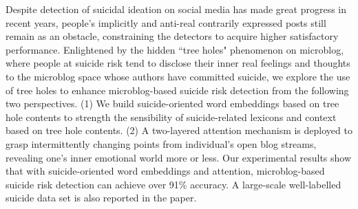 Despite detection of suicidal ideation on social media has made great progress in recent years, people's implicitly and anti-real contrarily expressed posts still remain as an obstacle,
constraining the detectors to acquire higher satisfactory performance. Enlightened by the hidden ``tree holes" phenomenon on microblog, where people at suicide risk tend to disclose their inner real feelings and thoughts to the microblog space whose authors have committed suicide, we explore the use of tree holes to enhance microblog-based suicide risk detection from the following two perspectives.
(1) We build suicide-oriented word embeddings based on tree hole contents
to strength the sensibility of suicide-related lexicons and context based on tree hole contents.
(2) A two-layered attention mechanism is deployed to grasp intermittently changing points
from individual's open blog streams, revealing one's inner emotional world more or less.
Our experimental results show that with suicide-oriented word embeddings and attention,
microblog-based suicide risk detection can achieve over 91\% accuracy.
A large-scale well-labelled suicide data set is also reported in the paper.